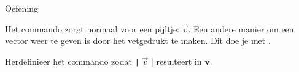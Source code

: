 \begin{frame}[fragile]{Oefening}

Het commando \texttt{\vec} zorgt normaal voor een pijltje: 
$\vec{v}$. 
Een andere manier om een vector weer te geven is door het vetgedrukt
te maken. Dit doe je met \texttt{\mathbf}. 

Herdefinieer het commando \texttt{\vec} zodat \texttt
| $\vec{v}$ |
resulteert in $\mathbf{v}$.  

\pause 

\begin{tcolorbox}[colback=white, colframe=green!70!black,title={Antwoord}]
    \texttt{\renewcommand{\vec}{\mathbf}}
\end{tcolorbox}
\end{frame}